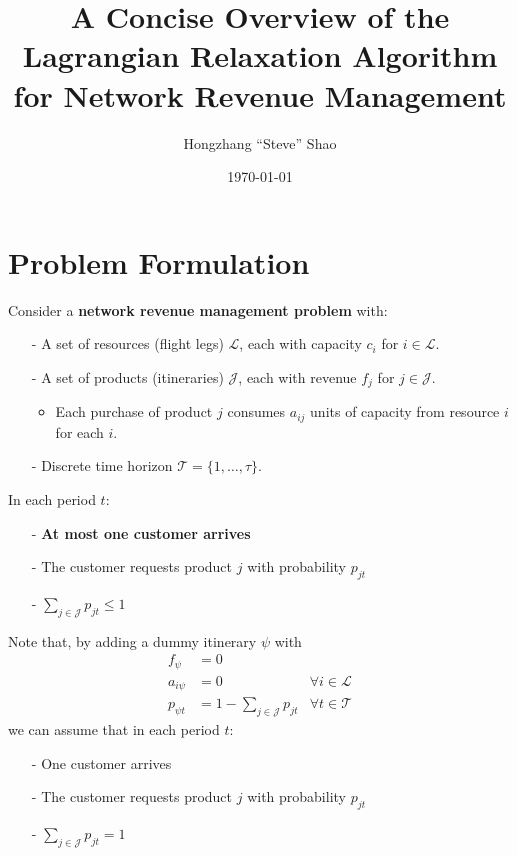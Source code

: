 \documentclass[11pt]{article}
\title{A Concise Overview of the Lagrangian Relaxation Algorithm for Network Revenue Management}
\author{Hongzhang ``Steve'' Shao}
\date{\today}
\begin{document}
\maketitle

\vspace{0.5cm}




\section{Problem Formulation}

Consider a \textbf{network revenue management problem} with:
\begin{itemize}[itemsep=0pt,parsep=0pt]
\item[-] A set of resources (flight legs) $\mathcal{L}$, each with capacity $c_i$ for $i\in \mathcal{L}$. 
\item[-] A set of products (itineraries) $\mathcal{J}$, each with revenue $f_j$ for $j\in \mathcal{J}$. 
    \begin{itemize}[itemsep=0pt,parsep=0pt]
    \item Each purchase of product $j$ consumes $a_{ij}$ units of capacity from resource $i$ for each $i$. 
    \end{itemize}
\item[-] Discrete time horizon $\mathcal{T}=\{1,\ldots,\tau\}$. 
\end{itemize}

\noindent
In each period $t$:
\begin{itemize}[itemsep=0pt,parsep=0pt]
\item[-] \textbf{At most one customer arrives}
\item[-] The customer requests product $j$ with probability $p_{jt}$
\item[-] $\sum_{j\in \mathcal{J}} p_{jt} \le 1$
\end{itemize}

\noindent
Note that, by adding a dummy itinerary $\psi$ with 
\begin{align*}
    f_{\psi} &= 0 \\
    a_{i\psi} &= 0 & \forall i \in \mathcal{L} \\
    p_{\psi t} &= 1 - \sum_{j\in \mathcal{J}} p_{jt} & \forall t \in \mathcal{T}
\end{align*}
we can assume that in each period $t$:
\begin{itemize}[itemsep=0pt,parsep=0pt]
\item[-] One customer arrives
\item[-] The customer requests product $j$ with probability $p_{jt}$
\item[-] $\sum_{j\in \mathcal{J}} p_{jt} = 1$
\end{itemize}
\end{document}

